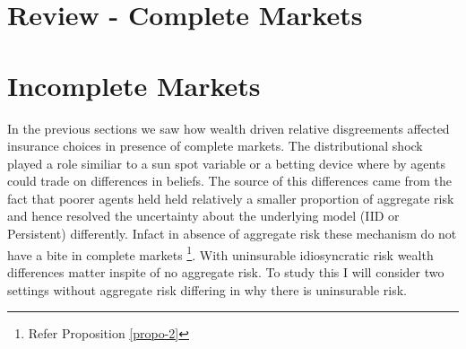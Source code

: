 \documentclass[12pt]{article}
\begin{document}
\begin{figure}[htbp]
\centering
{}
\label{fig:MPRDdraw_persistent}
\end{figure} 

%
%
%
%
%
%

\section{Review - Complete Markets}

\section{Incomplete Markets}
In the previous sections we saw how wealth driven relative disgreements affected insurance choices in presence of complete markets. The distributional shock played a role similiar to a sun spot variable or a betting device where by agents could trade on differences in beliefs. The source of this differences came from the fact that poorer agents held held relatively a smaller proportion of aggregate risk and hence resolved the uncertainty about the underlying model (IID or Persistent) differently. Infact in absence of aggregate risk these mechanism do not have a bite in complete markets \footnote{Refer Proposition \ref{propo-2}}. With uninsurable idiosyncratic risk wealth differences matter inspite of no aggregate risk. To study this I will consider two settings without aggregate risk differing in why there is uninsurable risk. 
\end{document}
